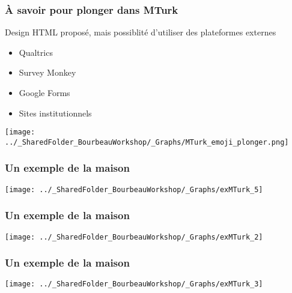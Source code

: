 \documentclass{beamer}
\begin{document}
    \begin{frame}
    
      \frametitle{À savoir pour plonger dans MTurk} \vspace{1cm}
      
      Design HTML proposé, mais possiblité d'utiliser des plateformes externes
       \begin{itemize}
          \item{Qualtrics}
          \item{Survey Monkey}
          \item{Google Forms}
          \item{Sites institutionnels}
        \end{itemize}
   
   \begin{flushright}
     	    \texttt{[image: ../\_SharedFolder\_BourbeauWorkshop/\_Graphs/MTurk\_emoji\_plonger.png]}
    \end{flushright} 
         
    \end{frame}  
        

     \begin{frame}
	        \frametitle{Un exemple de la maison} \vspace{1cm}   
	        \begin{center}
	           \texttt{[image: ../\_SharedFolder\_BourbeauWorkshop/\_Graphs/exMTurk\_5]}
	        \end{center}  
	    \end{frame}
    
     \begin{frame}
	        \frametitle{Un exemple de la maison} \vspace{1cm}   
	        \begin{center}
	           \texttt{[image: ../\_SharedFolder\_BourbeauWorkshop/\_Graphs/exMTurk\_2]}
	        \end{center}  
	    \end{frame}
    
     \begin{frame}
	        \frametitle{Un exemple de la maison} \vspace{1cm}   
	        \begin{center}
	           \texttt{[image: ../\_SharedFolder\_BourbeauWorkshop/\_Graphs/exMTurk\_3]}
	        \end{center}  
	    \end{frame}
    
\end{document}
